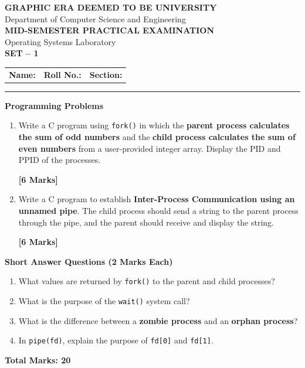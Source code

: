 \documentclass[10pt,a4paper]{article}
\makeatletter
\newcommand{\examheader}[1]{
\begin{center}
{\large\bfseries GRAPHIC ERA DEEMED TO BE UNIVERSITY}\\[-1mm]
{\small Department of Computer Science and Engineering}\\[1mm]
{\bfseries MID-SEMESTER PRACTICAL EXAMINATION}\\[-1mm]
{\small Operating Systems Laboratory}\\[1mm]
{\large\bfseries SET -- #1}
\end{center}

\vspace{-1mm}

\begin{tabular}{@{}p{0.33\textwidth}p{0.32\textwidth}p{0.31\textwidth}@{}}
\textbf{Name:} \hrulefill &
\textbf{Roll No.:} \hrulefill &
\textbf{Section:} \hrulefill
\end{tabular}

\vspace{1mm}
\hrule
\vspace{1mm}
}
\makeatother
\begin{document}

\examheader{1}

\textbf{Programming Problems}

\begin{enumerate}[leftmargin=5mm,itemsep=2pt,label=\textbf{P\arabic*.}]

\item
Write a C program using \texttt{fork()} in which the
\textbf{parent process calculates the sum of odd numbers} and the
\textbf{child process calculates the sum of even numbers} from a
user-provided integer array. Display the PID and PPID of the processes.

\hfill\textbf{[6 Marks]}

\item
Write a C program to establish \textbf{Inter-Process Communication
using an unnamed pipe}. The child process should send a string to the
parent process through the pipe, and the parent should receive and
display the string.

\hfill\textbf{[6 Marks]}

\end{enumerate}

\vspace{1mm}

\textbf{Short Answer Questions \hfill (2 Marks Each)}

\begin{enumerate}[leftmargin=7mm,itemsep=1pt,label=\textbf{Q\arabic*.}]

\item What values are returned by \texttt{fork()} to the parent and
child processes?

\item What is the purpose of the \texttt{wait()} system call?

\item What is the difference between a \textbf{zombie process} and an
\textbf{orphan process}?

\item In \texttt{pipe(fd)}, explain the purpose of
\texttt{fd[0]} and \texttt{fd[1]}.

\end{enumerate}

\vspace{1mm}

\begin{center}
\textbf{Total Marks: 20}
\end{center}
\end{document}
